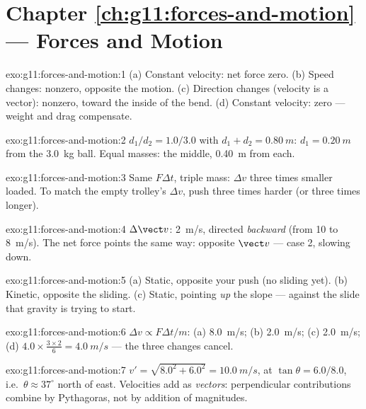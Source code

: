 \section*{Chapter \ref{ch:g11:forces-and-motion} --- Forces and Motion}

\begin{solution}{exo:g11:forces-and-motion:1}
(a) Constant velocity: net force zero. (b) Speed changes: nonzero,
opposite the motion. (c) Direction changes (velocity is a vector):
nonzero, toward the inside of the bend. (d) Constant velocity: zero ---
weight and drag compensate.
\end{solution}

\begin{solution}{exo:g11:forces-and-motion:2}
$d_1/d_2 = 1.0/3.0$ with $d_1 + d_2 = \qty{0.80}{m}$:
$d_1 = \qty{0.20}{m}$ from the \qty{3.0}{kg} ball. Equal masses: the
middle, \qty{0.40}{m} from each.
\end{solution}

\begin{solution}{exo:g11:forces-and-motion:3}
Same $F\Delta t$, triple mass: $\Delta v$ three times smaller loaded.
To match the empty trolley's $\Delta v$, push three times harder (or
three times longer).
\end{solution}

\begin{solution}{exo:g11:forces-and-motion:4}
$\Delta \vect v$: \qty{2}{m/s}, directed \emph{backward} (from
\num{10} to \qty{8}{m/s}). The net force points the same way:
opposite $\vect v$ --- case 2, slowing down.
\end{solution}

\begin{solution}{exo:g11:forces-and-motion:5}
(a) Static, opposite your push (no sliding yet). (b) Kinetic, opposite
the sliding. (c) Static, pointing \emph{up} the slope --- against the
slide that gravity is trying to start.
\end{solution}

\begin{solution}{exo:g11:forces-and-motion:6}
$\Delta v \propto F\Delta t/m$: (a) \qty{8.0}{m/s}; (b) \qty{2.0}{m/s};
(c) \qty{2.0}{m/s}; (d) $4.0 \times \frac{3 \times 2}{6} =
\qty{4.0}{m/s}$ --- the three changes cancel.
\end{solution}

\begin{solution}{exo:g11:forces-and-motion:7}
$v' = \sqrt{8.0^2 + 6.0^2} = \qty{10.0}{m/s}$, at $\tan\theta =
6.0/8.0$, i.e.\ $\theta \approx 37^\circ$ north of east. Velocities add
as \emph{vectors}: perpendicular contributions combine by Pythagoras,
not by addition of magnitudes.
\end{solution}

